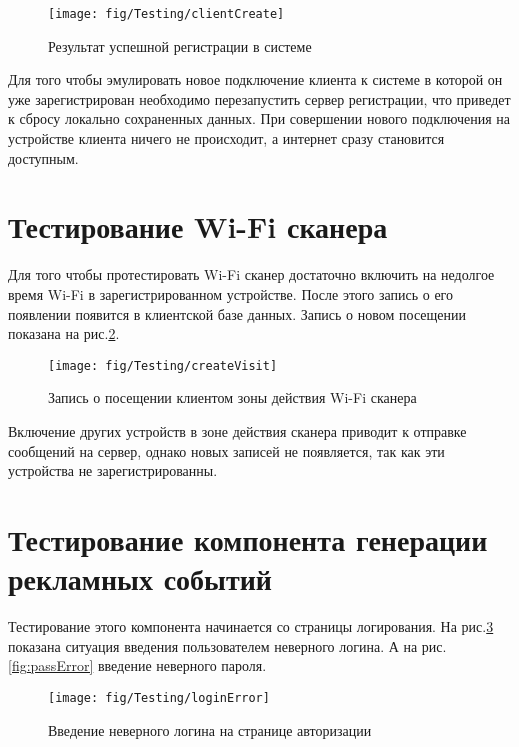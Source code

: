 \begin{figure}[H]
	\centering
	\texttt{[image: fig/Testing/clientCreate]}
	\caption{Результат успешной регистрации в системе}
	\label{fig:clientCreate}
\end{figure}

Для того чтобы эмулировать новое подключение клиента к системе в которой он уже зарегистрирован необходимо перезапустить сервер регистрации, что приведет к сбросу локально сохраненных данных. При совершении нового подключения на устройстве клиента ничего не происходит, а интернет сразу становится доступным.  

\section{Тестирование Wi-Fi сканера}

Для того чтобы протестировать Wi-Fi сканер достаточно включить на недолгое время Wi-Fi в зарегистрированном устройстве. После этого запись о его появлении появится в клиентской базе данных. Запись о новом посещении показана на рис.\ref{fig:createVisit}.

\begin{figure}[H]
	\centering
	\texttt{[image: fig/Testing/createVisit]}
	\caption{Запись о посещении клиентом зоны действия Wi-Fi сканера}
	\label{fig:createVisit}
\end{figure}

Включение других устройств в зоне действия сканера приводит к отправке сообщений на сервер, однако новых записей не появляется, так как эти устройства не зарегистрированны.

\section{Тестирование компонента генерации рекламных событий}

Тестирование этого компонента начинается со страницы логирования. На рис.\ref{fig:loginError} показана ситуация введения пользователем неверного логина. А на рис.\ref{fig:passError} введение неверного пароля.

\begin{figure}[H]
	\centering
	\texttt{[image: fig/Testing/loginError]}
	\caption{Введение неверного логина на странице авторизации}
	\label{fig:loginError}
\end{figure}

